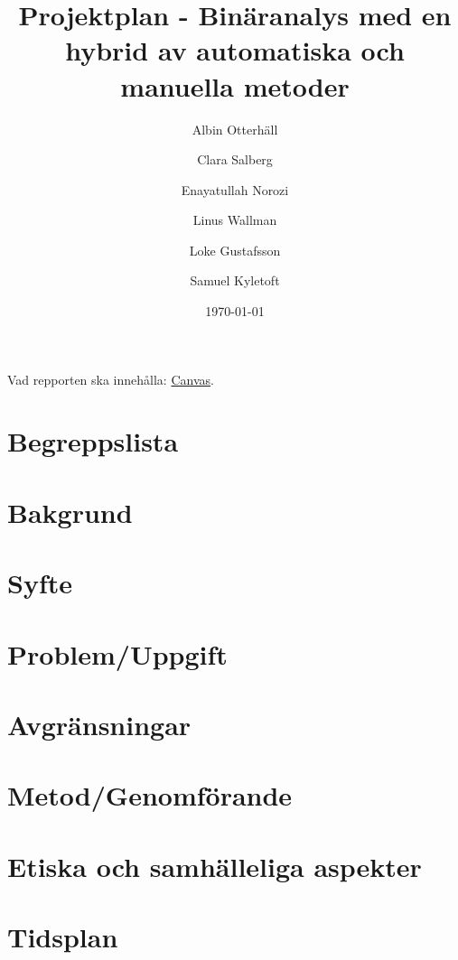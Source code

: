 \documentclass[12pt, a4paper]{article}
\title{Projektplan - Binäranalys med en hybrid av automatiska och manuella metoder}
\author{
    Albin Otterhäll \and
    Clara Salberg \and
    Enayatullah Norozi \and
    Linus Wallman \and
    Loke Gustafsson \and
    Samuel Kyletoft
}
\date{\today}
\begin{document}
%
\newcommand{\stoe}{S$^2$E}

\maketitle

\newpage

\listoftodos
\newpage

\tableofcontents
\newpage

Vad repporten ska innehålla:
\href{https://chalmers.instructure.com/courses/22323/assignments/66457?module_item_id=337856}{Canvas}.


\section{Begreppslista}


\section{Bakgrund}


\section{Syfte}


\section{Problem/Uppgift}


\section{Avgränsningar}


\section{Metod/Genomförande}


\section{Etiska och samhälleliga aspekter}


\section{Tidsplan}


\end{document}
